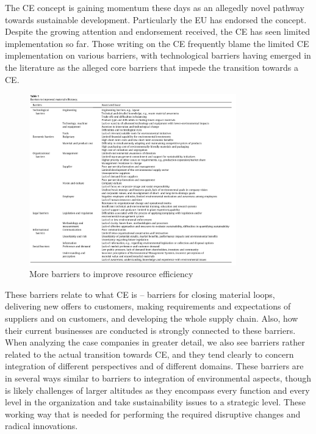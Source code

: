 The CE concept is gaining momentum these days as an allegedly
novel pathway towards sustainable development. Particularly the EU has endorsed the concept. Despite the growing attention and endorsement received, the CE has seen limited implementation so far. Those writing on the CE frequently blame the limited CE implementation on various barriers, with technological barriers having emerged in the literature as the alleged core barriers that impede the transition towards a CE. \par


\parencite{Shahbazi2016}
\begin{figure}[h!]
    \centering
    \includegraphics[width=0.8\textwidth]{sections/asset/more_barriers.PNG}
    \caption{More barriers to improve resource efficiency}
    \label{fig:ce_BARRIERS1}
\end{figure}


\parencite{Ritzen2017}
These barriers relate to what CE is – barriers for closing material loops, delivering new offers to customers, making requirements and expectations of suppliers and on customers, and developing the whole supply chain. Also, how their current businesses are conducted is strongly connected to these barriers. When analyzing the case companies in greater detail, we also see barriers rather related to the actual transition towards CE, and they tend clearly to concern integration of different perspectives and of different domains. These barriers are in several ways similar to barriers to integration of environmental aspects, though is likely challenges of larger altitudes as they encompass every function and every level in the organization and take sustainability issues to a strategic level. These working way that is needed for performing the required disruptive changes and radical innovations. \par


